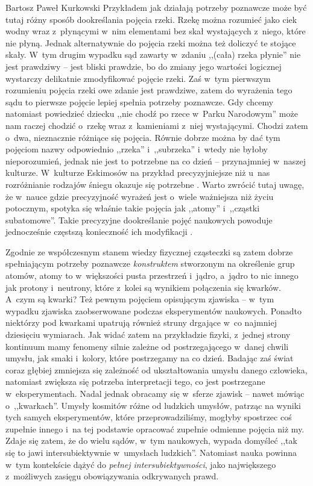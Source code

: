 \begin{artplenv}{Bartosz Paweł Kurkowski}
Przykładem jak działają potrzeby poznawcze może być tutaj różny sposób dookreślania pojęcia rzeki. Rzekę można rozumieć
jako ciek wodny wraz z~płynącymi w~nim elementami bez skał wystających z~niego, które nie płyną. Jednak alternatywnie
do pojęcia rzeki można też doliczyć te stojące skały. W~tym drugim wypadku sąd zawarty w~zdaniu ,,(cała) rzeka płynie''
nie jest prawdziwy -- jest bliski prawdzie, bo do zmiany jego wartości logicznej wystarczy delikatnie zmodyfikować
pojęcie rzeki. Zaś w~tym pierwszym rozumieniu pojęcia rzeki owe zdanie jest prawdziwe, zatem do wyrażenia tego sądu to
pierwsze pojęcie lepiej spełnia potrzeby poznawcze. Gdy chcemy natomiast powiedzieć dziecku ,,nie chodź po rzece w~Parku
Narodowym'' może nam raczej chodzić o~rzekę wraz z~kamieniami z~niej wystającymi. Chodzi zatem o~dwa, nieznacznie
różniące się pojęcia. Równie dobrze można by dać tym pojęciom nazwy odpowiednio ,,rzeka'' i~,,subrzeka'' i~wtedy nie byłoby
nieporozumień, jednak nie jest to potrzebne na co dzień -- przynajmniej w~naszej kulturze. W~kulturze Eskimosów na
przykład precyzyjniejsze niż u~nas rozróżnianie rodzajów śniegu okazuje się potrzebne
\parencite[s.~148]{grobler_prawda_2000}.
Warto zwrócić tutaj uwagę, że w~nauce gdzie precyzyjność wyrażeń jest
o~wiele ważniejsza niż życiu potocznym, spotyka się właśnie takie pojęcia jak ,,atomy'' i~,,cząstki subatomowe''. Takie
precyzyjne dookreślanie pojęć naukowych powoduje jednocześnie częstszą konieczność ich modyfikacji
\parencite[s.~118–122]{grobler_prawda_2000}.


Zgodnie ze współczesnym stanem wiedzy fizycznej cząsteczki są zatem dobrze spełniającym potrzeby poznawcze
\textit{konstruktem} stworzonym na określenie grup atomów, atomy to w~większości pusta przestrzeń i~jądro, a~jądro to
nic innego jak protony i~neutrony, które z~kolei są wynikiem połączenia się kwarków. A~czym są kwarki? Też pewnym
pojęciem opisującym zjawiska -- w~tym wypadku zjawiska zaobserwowane podczas eksperymentów naukowych. Ponadto niektórzy
pod kwarkami upatrują również struny drgające w~co najmniej dziesięciu wymiarach. Jak widać zatem na przykładzie
fizyki, z~jednej strony kontinuum mamy fenomeny silnie zależne od postrzegającego w~danej chwili umysłu, jak
smaki i~kolory, które postrzegamy na co dzień. Badając zaś świat coraz głębiej zmniejsza się zależność od ukształtowania umysłu
danego człowieka, natomiast zwiększa się potrzeba interpretacji tego, co jest postrzegane w~eksperymentach. Nadal
jednak obracamy się w~sferze zjawisk -- nawet mówiąc o~,,kwarkach''. Umysły kosmitów różne od ludzkich umysłów, patrząc na
wyniki tych samych eksperymentów, które przeprowadziliśmy, mogłyby spostrzec coś zupełnie innego i~na tej podstawie
opracować zupełnie odmienne pojęcia niż my. Zdaje się zatem, że do wielu sądów, w~tym naukowych, wypada domyśleć ,,tak
się to jawi intersubiektywnie w~umysłach ludzkich''. Natomiast nauka powinna w~tym kontekście dążyć do \textit{pełnej
intersubiektywności}, jako największego z~możliwych zasięgu obowiązywania odkrywanych prawd.



\end{artplenv}
